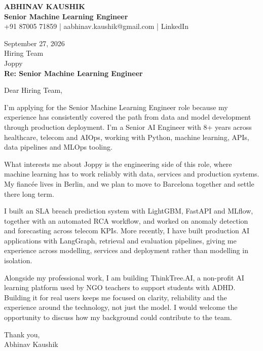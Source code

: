 \documentclass[10pt,a4paper]{article}
\begin{document}
\begin{center}
{\Large\bfseries ABHINAV KAUSHIK}\\[2pt]
{\bfseries Senior Machine Learning Engineer}\\[2pt]
+91 87005 71859 \quad | \quad aabhinav.kaushik@gmail.com \quad | \quad LinkedIn
\end{center}
\vspace{8pt}
September 27, 2026\\[6pt]
Hiring Team\\
Joppy\\[4pt]
\textbf{Re: Senior Machine Learning Engineer}

Dear Hiring Team,

I’m applying for the Senior Machine Learning Engineer role because my experience has consistently covered the path from data and model development through production deployment. I’m a Senior AI Engineer with 8+ years across healthcare, telecom and AIOps, working with Python, machine learning, APIs, data pipelines and MLOps tooling.

What interests me about Joppy is the engineering side of this role, where machine learning has to work reliably with data, services and production systems. My fiancée lives in Berlin, and we plan to move to Barcelona together and settle there long term.

I built an SLA breach prediction system with LightGBM, FastAPI and MLflow, together with an automated RCA workflow, and worked on anomaly detection and forecasting across telecom KPIs. More recently, I have built production AI applications with LangGraph, retrieval and evaluation pipelines, giving me experience across modelling, services and deployment rather than modelling in isolation.

Alongside my professional work, I am building ThinkTree.AI, a non-profit AI learning platform used by NGO teachers to support students with ADHD. Building it for real users keeps me focused on clarity, reliability and the experience around the technology, not just the model. I would welcome the opportunity to discuss how my background could contribute to the team.

Thank you,\\
Abhinav Kaushik
\end{document}
